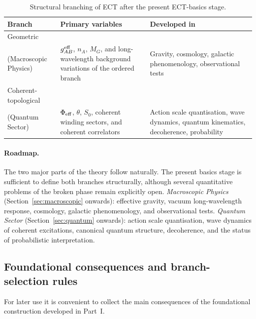 \documentclass[11pt,a4paper]{article}
\numberwithin{equation}{section}
\begin{document}
\begin{table}[H]
\centering\small
\caption{Structural branching of ECT after the present ECT-basics stage.}
\label{tab:ect_branching}
\begin{tabular}{p{3cm}p{5cm}p{4.5cm}}
\hline\hline
\textbf{Branch} & \textbf{Primary variables} & \textbf{Developed in} \\
\hline
Geometric\\(Macroscopic Physics)
  & $g^{\rm eff}_{AB}$, $n_A$, $M_G$, and long-wavelength
    background variations of the ordered branch
  & Gravity, cosmology, galactic phenomenology, observational tests \\
Coherent-topological\\(Quantum Sector)
  & $\Phi_{\rm eff}$, $\theta$, $S_0$, coherent winding sectors,
    and coherent correlators
  & Action scale quantisation, wave dynamics, quantum kinematics, decoherence, probability \\
\hline\hline
\end{tabular}
\end{table}

\paragraph{Roadmap.}
The two major parts of the theory follow naturally.
The present basics stage is sufficient to define both branches
structurally, although several quantitative problems of the broken
phase remain explicitly open.
\textit{Macroscopic Physics} (Section~\ref{sec:macroscopic} onwards):
effective gravity, vacuum long-wavelength response, cosmology,
galactic phenomenology, and observational tests.
\textit{Quantum Sector} (Section~\ref{sec:quantum} onwards):
action scale quantisation, wave dynamics of coherent excitations,
canonical quantum structure, decoherence, and the status of
probabilistic interpretation.


\subsection{Foundational consequences and branch-selection rules}
\label{sec:foundational_consequences}

For later use it is convenient to collect the main consequences of the
foundational construction developed in Part~I.
\end{document}
